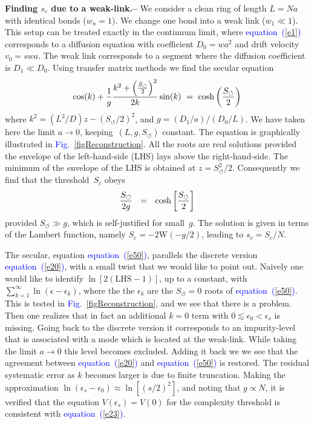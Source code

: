 \documentclass[aps,pre,floats,floatfix,twocolumn]{revtex4}
\newcommand{\be}[1]{\begin{eqnarray}\ifthenelse{#1=-1}{\nonumber}{\ifthenelse{#1=0}{}{\label{e#1}}}}
\newcommand{\eeq}{\end{eqnarray}}
\newcommand{\Eq}[1]{\textcolor{blue}{{equation}\!~(\ref{#1})}}
\newcommand{\Fig}[1]{\textcolor{blue}{Fig.}\!\!~\ref{#1}}
\newcommand{\sect}[1]{{\bf #1.-- }}
\begin{document}
\sect{Finding $s_c$ due to a weak-link}
%
We consider a clean ring of length ${L=Na}$ 
with identical bonds (${w_n=1}$).  
We change one bond into a weak link (${w_1 \ll 1}$). 
This setup can be treated exactly in the continuum limit, 
where \Eq{e1} corresponds to a diffusion equation  
with coefficient ${D_0=wa^2}$ and drift velocity ${v_0=swa}$.  
The weak link corresponds to a segment 
where the diffusion coefficient is ${D_1 \ll D_0}$.  
Using transfer matrix methods we find the secular equation 
%
\be{50}
\cos(k) + \frac{1}{g} \frac{k^2+\left(\frac{S_{\circlearrowleft}}{2}\right)^2}{2k}\sin(k)
\ = \ \cosh \left(\frac{S_{\circlearrowleft}}{2} \right)
\eeq
%
where ${k^2= (L^2/D) z - (S_{\circlearrowleft}/2)^2}$, 
and $g=(D_1/a)/(D_0/L)$. We have taken here 
the limit ${a\rightarrow0}$, keeping~$(L,g,S_{\circlearrowleft})$ constant. 
The equation is graphically illustrated in \Fig{figReconstruction}. 
All the roots are real solutions provided the envelope 
of the left-hand-side (LHS) lays above the right-hand-side.
The minimum of the envelope of the LHS is obtained at ${z = S_{\circlearrowleft}^2/2}$.
Consequently we find that the threshold~$S_c$ obeys 
%
\be{23}
\frac{S_{\circlearrowleft}}{2g} \ \ = \ \ \cosh\left[ \frac{S_{\circlearrowleft}}{2} \right]
\eeq
%
provided $S_{\circlearrowleft} \gg g$, which is self-justified for small~$g$.   
The solution is given in terms of the Lambert function, 
namely ${S_c = -2 \mathrm{W}(-g/2)}$, leading to ${s_c=S_c/N}$.

 
The secular, equation \Eq{e50}, parallels the discrete version \Eq{e20}, 
with a small twist that we would like to point out.
Naively one would like to identify $\ln [2 (\text{LHS} -1)]$, 
up to a constant, with $\sum_{k=1}^{\infty} \ln(\epsilon-\epsilon_k)$, 
where the the $\epsilon_k$ are the $S_{\circlearrowleft}{=}0$ 
roots of \Eq{e50}. This is tested in \Fig{figReconstruction}, 
and we see that there is a problem. Then one realizes 
that in fact an additional $k=0$ term with ${0 \lesssim \epsilon_0 < \epsilon_s}$ 
is missing. Going back to the discrete version it corresponds 
to an impurity-level that is associated with a mode which is located 
at the weak-link.
While taking the limit ${a\rightarrow0}$ this level becomes excluded.
Adding it back we we see that the agreement between \Eq{e20}      
and \Eq{e50} is restored. The residual systematic error as $k$ becomes 
larger is due to finite truncation. 
%
Making the approximation ${\ln(\epsilon_s-\epsilon_0) \approx \ln[(s/2)^2]}$,  
and noting that ${g\propto N}$, it is verified that the 
equation  ${V(\epsilon_s) = V(0)}$  for the complexity threshold 
is consistent with \Eq{e23}. 
\end{document}
